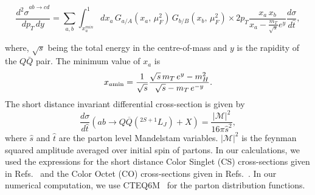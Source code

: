 \documentclass[aps,prc,preprint,superscriptaddress,showpacs,showkeys,amsmath]{revtex4-1}
\begin{document}
\begin{equation}
  \frac{{d^{2}\sigma}^{ab\rightarrow cd}}{dp_T\,dy} = \sum_{a,b}\int_{x_{a}^{min}}^{1} dx_a\, G_{a/A}(x_a,\,\mu^{2}_{F})\, G_{b/B}(x_b,\,\mu^{2}_{F})\times 
  2p_T \frac{x_a\,x_b}{x_a-\frac{m_T}{\sqrt{s}}e^y}\frac{d\sigma}{d\hat t},
\end{equation}

where, $\sqrt{s}$ being the total energy in the centre-of-mass and $y$ is the rapidity of 
the $Q\bar Q$ pair. The minimum value of $x_a$ is 
\begin{equation}
x_{a\rm min} = \frac{1}{\sqrt{s}}\frac{\sqrt{s}\,m_T\,e^{y}-m^2_H}{\sqrt{s}-m_T\,e^{-y}}.
\end{equation}
The short distance invariant differential cross-section is given by
\begin{equation}
  \frac{d\sigma}{d\hat t}(ab\rightarrow Q\overline{Q}(^{2S+1}L_{J})+X) = \frac{|\mathcal{M}|^2}{16\pi{\hat s}^2},
\end{equation}
where $\hat s$ and $\hat t$ are the parton level Mandelstam variables. $|\mathcal{M}|^2$ is the 
feynman squared amplitude averaged over initial spin of partons.  In our calculations, we used the expressions 
for the short distance Color Singlet (CS) cross-sections given in Refs.~\cite{Baier:1983va,Humpert:1986cy,Gastmans:1987be} 
and the Color Octet (CO) cross-sections given in Refs.~\cite{Cho:1995vh,Cho:1995ce,Braaten:2000cm}. In our numerical computation, 
we use CTEQ6M~\cite{Lai:2010vv} for the parton distribution functions. 
\end{document}
